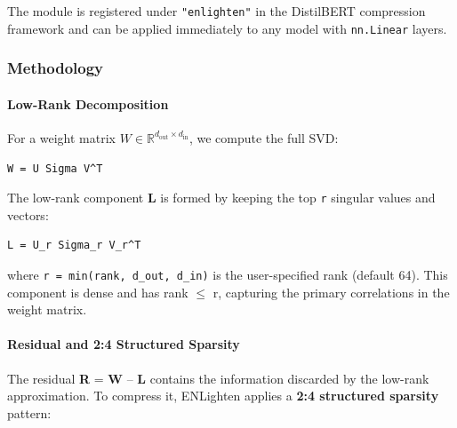 The module is registered under \texttt{"enlighten"} in the DistilBERT compression framework and can be applied immediately to any model with \texttt{nn.Linear} layers.


\subsubsection*{Methodology}

\paragraph{Low-Rank Decomposition}

For a weight matrix $W \in \mathbb{R}^{d_{\text{out}} \times d_{\text{in}}}$, we compute the full SVD:

\vspace{0.5em}
\begin{mdframed}[backgroundcolor=codebg, linecolor=codeframe, linewidth=1pt, roundcorner=4pt, innerleftmargin=2pt, innerrightmargin=5pt, innertopmargin=5pt, innerbottommargin=5pt]
\begin{lstlisting}
W = U Sigma V^T
\end{lstlisting}
\end{mdframed}
\vspace{0.5em}

The low-rank component \textbf{L} is formed by keeping the top \texttt{r} singular values and vectors:

\vspace{0.5em}
\begin{mdframed}[backgroundcolor=codebg, linecolor=codeframe, linewidth=1pt, roundcorner=4pt, innerleftmargin=2pt, innerrightmargin=5pt, innertopmargin=5pt, innerbottommargin=5pt]
\begin{lstlisting}
L = U_r Sigma_r V_r^T
\end{lstlisting}
\end{mdframed}
\vspace{0.5em}

where \texttt{r = min(rank, d\_out, d\_in)} is the user-specified rank (default 64). This component is dense and has rank $\le$ r, capturing the primary correlations in the weight matrix.

\paragraph{Residual and 2:4 Structured Sparsity}

The residual \textbf{R} = \textbf{W} -- \textbf{L} contains the information discarded by the low-rank approximation. To compress it, ENLighten applies a \textbf{2:4 structured sparsity} pattern:

